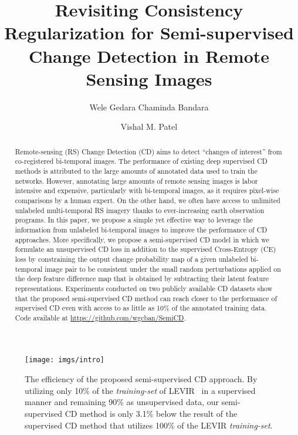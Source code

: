 \documentclass[runningheads]{llncs}
\begin{document}
\pagestyle{headings}
\mainmatter
\def\ECCVSubNumber{1038}

\title{Revisiting Consistency Regularization for Semi-supervised Change Detection in Remote Sensing Images}

\begin{comment}
\titlerunning{ECCV-22 submission ID \ECCVSubNumber} 
\authorrunning{ECCV-22 submission ID \ECCVSubNumber} 
\author{Anonymous ECCV submission}
\institute{Paper ID \ECCVSubNumber}
\end{comment}


\author{Wele Gedara Chaminda Bandara \and
Vishal M. Patel}


\maketitle

\begin{abstract}
Remote-sensing (RS) Change Detection (CD) aims to detect ``changes of interest'' from co-registered bi-temporal images. The performance of existing deep supervised CD methods is attributed to the large amounts of annotated data used to train the networks. However, annotating large amounts of remote sensing images is labor intensive and expensive, particularly with bi-temporal images, as it requires pixel-wise comparisons by a human expert. On the other hand, we often have access to unlimited unlabeled multi-temporal RS imagery thanks to ever-increasing earth observation programs. In this paper, we propose a simple yet effective way to leverage the information from unlabeled bi-temporal images to improve the performance of CD approaches. More specifically, we propose a semi-supervised CD model in which we formulate an unsupervised CD loss in addition to the supervised Cross-Entropy (CE) loss by constraining the output change probability map of a given unlabeled bi-temporal image pair to be consistent under the small random perturbations applied on the deep feature difference map that is obtained by subtracting their latent feature representations. Experiments conducted on two publicly available CD datasets show that the proposed semi-supervised CD method can reach closer to the performance of supervised CD even with access to as little as 10\% of the annotated training data. Code available at \href{https://github.com/wgcban/SemiCD}{https://github.com/wgcban/SemiCD}.
\end{abstract}
\vspace{-5mm}
\begin{figure}[!htb]
    \centering
    \texttt{[image: imgs/intro]}
    \caption{The efficiency of the proposed semi-supervised CD approach. By utilizing only 10\% of the \textit{training-set} of LEVIR~\cite{levid-cd} in a supervised manner and remaining 90\% as unsupervised data, our semi-supervised CD method is only 3.1\% below the result of the supervised CD method that utilizes 100\% of the LEVIR \textit{training-set}.}
    \label{fig:intro}
\end{figure}
\end{document}
